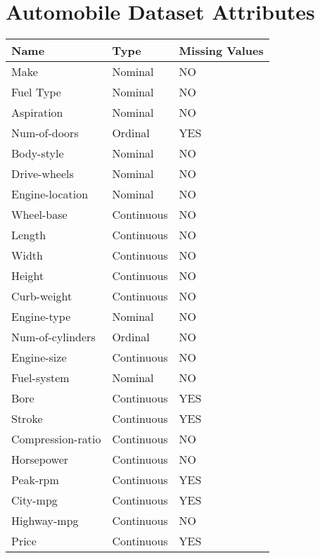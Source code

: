 \appendix
\chapter{Automobile Dataset Attributes}\label{attributes}
\begin{tabularx}{\textwidth}{|X|l|l|}
	\hline
	\textbf{Name}     & \textbf{Type} & \textbf{Missing Values} \\
	\hline
	Make              & Nominal       & NO                      \\
	Fuel Type         & Nominal       & NO                      \\
	Aspiration        & Nominal       & NO                      \\
	Num-of-doors      & Ordinal       & YES                     \\
	Body-style        & Nominal       & NO                      \\
	Drive-wheels      & Nominal       & NO                      \\
	Engine-location   & Nominal       & NO                      \\
	Wheel-base        & Continuous    & NO                      \\
	Length            & Continuous    & NO                      \\
	Width             & Continuous    & NO                      \\
	Height            & Continuous    & NO                      \\
	Curb-weight       & Continuous    & NO                      \\
	Engine-type       & Nominal       & NO                      \\
	Num-of-cylinders  & Ordinal       & NO                      \\
	Engine-size       & Continuous    & NO                      \\
	Fuel-system       & Nominal       & NO                      \\
	Bore              & Continuous    & YES                     \\
	Stroke            & Continuous    & YES                     \\
	Compression-ratio & Continuous    & NO                      \\
	Horsepower        & Continuous    & NO                      \\
	Peak-rpm          & Continuous    & YES                     \\
	City-mpg          & Continuous    & YES                     \\
	Highway-mpg       & Continuous    & NO                      \\
	Price             & Continuous    & YES                     \\
	\hline
\end{tabularx}